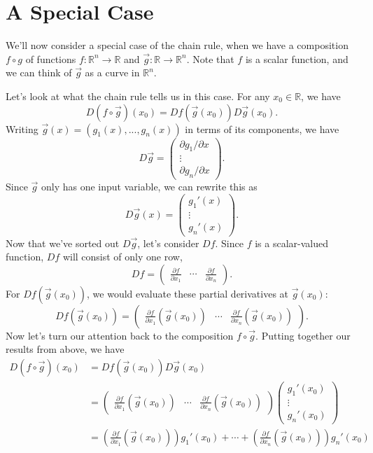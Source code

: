 \documentclass{ximera}
\begin{document}
\section*{A Special Case}

We'll now consider a special case of the chain rule, when we have a composition $f\circ g$ of functions $f:\mathbb{R}^n\rightarrow\mathbb{R}$ and $\vec{g}:\mathbb{R}\rightarrow\mathbb{R}^n$. Note that $f$ is a scalar function, and we can think of $\vec{g}$ as a curve in $\mathbb{R}^n$.

Let's look at what the chain rule tells us in this case. For any $x_0\in\mathbb{R}$, we have
\[ 
D(f\circ\vec{g})(x_0) = Df(\vec{g}(x_0))D\vec{g}(x_0).
\]
Writing $\vec{g}(x) = (g_1(x),...,g_n(x))$ in terms of its components, we have
\[
D\vec{g} = \left(\begin{array}{c}\partial g_1/\partial x\\ \vdots\\\partial g_n/\partial x\end{array}\right).
\]
Since $\vec{g}$ only has one input variable, we can rewrite this as
\[
D\vec{g}(x) = \left(\begin{array}{c}g_1'(x)\\ \vdots\\g_n'(x)\end{array}\right).
\]
Now that we've sorted out $D\vec{g}$, let's consider $Df$. Since $f$ is a scalar-valued function, $Df$ will consist of only one row,
\[
Df = \left(\begin{array}{ccc}\frac{\partial f}{\partial x_1} & \cdots & \frac{\partial f}{\partial x_n}\end{array}\right).
\]
For $Df(\vec{g}(x_0))$, we would evaluate these partial derivatives at $\vec{g}(x_0)$:
\[
Df(\vec{g}(x_0)) = \left(\begin{array}{ccc}\frac{\partial f}{\partial x_1}(\vec{g}(x_0)) & \cdots & \frac{\partial f}{\partial x_n}(\vec{g}(x_0))\end{array}\right).
\]
Now let's turn our attention back to the composition $f\circ\vec{g}$. Putting together our results from above, we have
\begin{align*}
D(f\circ\vec{g})(x_0) &= Df(\vec{g}(x_0))D\vec{g}(x_0)\\
&= \left(\begin{array}{ccc}\frac{\partial f}{\partial x_1}(\vec{g}(x_0)) & \cdots & \frac{\partial f}{\partial x_n}(\vec{g}(x_0))\end{array}\right)\left(\begin{array}{c}g_1'(x_0)\\ \vdots\\g_n'(x_0)\end{array}\right)\\
&=\left(\frac{\partial f}{\partial x_1}(\vec{g}(x_0))\right)g_1'(x_0)+\cdots + \left(\frac{\partial f}{\partial x_n}(\vec{g}(x_0))\right)g_n'(x_0)
\end{align*}
\end{document}
